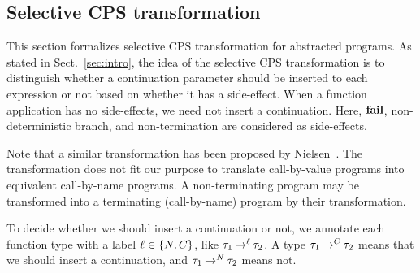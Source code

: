 \subsection{Selective CPS transformation}
\label{sec:CPS}

This section formalizes selective CPS transformation for abstracted
programs.  As stated in Sect.~\ref{sec:intro}, the idea of the selective
CPS transformation is to distinguish whether a continuation parameter
should be inserted to each expression or not based on whether it has a
side-effect.  When a function application has no side-effects, we need
not insert a continuation.  Here, $\mathbf{fail}$,
non-deterministic branch, and non-termination are considered as
side-effects.

Note that a similar transformation has been proposed by
Nielsen~\cite{Nielsen2001}.  The transformation does not fit our purpose
to translate call-by-value programs into equivalent call-by-name
programs.  A non-terminating program may be transformed into a
terminating (call-by-name) program by their transformation.

To decide whether we should insert a continuation or not, we
annotate each function type with a label $\ell \in \{N,C\}$, like
${\tau_1}\mathbin{\rightarrow^{\ell}}{\tau_2}$.  A type ${\tau_1}\mathbin{\rightarrow^{C}}{\tau_2}$ means
that we should insert a continuation, and ${\tau_1}\mathbin{\rightarrow^{N}}{\tau_2}$ means
not.

